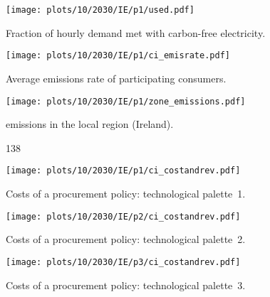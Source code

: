 \begin{figure*}
    \centering
    \begin{subfigure}{0.5\textwidth}
        \centering
        \caption{Fraction of hourly demand met with carbon-free electricity.}
        \texttt{[image: plots/10/2030/IE/p1/used.pdf]}
        \label{fig:10-2030-IE-p1-used}
    \end{subfigure}%
    \begin{subfigure}{0.5\textwidth}
        \centering
        \caption{Average emissions rate of participating consumers.}
        \texttt{[image: plots/10/2030/IE/p1/ci\_emisrate.pdf]}
        \label{fig:10-2030-IE-p1-ci_emisrate}
    \end{subfigure}

    \begin{subfigure}{0.5\textwidth}
        \centering
        \caption{\co emissions in the local region (Ireland).}
        \texttt{[image: plots/10/2030/IE/p1/zone\_emissions.pdf]}
        \label{fig:10-2030-IE-p1-zone_emissions}
    \end{subfigure}%
    \begin{subfigure}{0.5\textwidth}138
        \caption{Costs of a procurement policy: technological palette~1.}
        \texttt{[image: plots/10/2030/IE/p1/ci\_costandrev.pdf]}
        \label{fig:10-2030-IE-p1-ci_costandrev}
    \end{subfigure}%

    \begin{subfigure}{0.5\textwidth}
        \centering
        \caption{Costs of a procurement policy: technological palette~2.}
        \texttt{[image: plots/10/2030/IE/p2/ci\_costandrev.pdf]}
        \label{fig:10-2030-IE-p2-ci_costandrev}
    \end{subfigure}%
    \begin{subfigure}{0.5\textwidth}
        \centering
        \caption{Costs of a procurement policy: technological palette~3.}
        \texttt{[image: plots/10/2030/IE/p3/ci\_costandrev.pdf]}
        \label{fig:10-2030-IE-p3-ci_costandrev}
    \end{subfigure}

    \caption{Results for the case of Ireland 2030. 10\% participation rate. 
    Figures \ref{fig:10-2030-IE-p1-used}--\ref{fig:10-2030-IE-p1-ci_costandrev} display the technological palette~1 scenario.}
    \label{fig:10-2030-IE-6plots}
\end{figure*}



